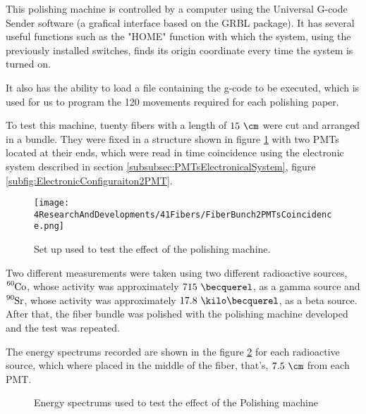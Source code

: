 This polishing machine is controlled by a computer using the Universal G-code Sender software (a grafical interface based on the GRBL package). It has several useful functions such as the "HOME" function with which the system, using the previously installed switches, finds its origin coordinate every time the system is turned on. 

It also has the ability to load a file containing the g-code to be executed, which is used for us to program the 120 movements required for each polishing paper.

To test this machine, tuenty fibers with a length of $15~\cm$ were cut and arranged in a bundle. They were fixed in a structure shown in figure \ref{fig:BunchWith2PMTsCoincidence} with two PMTs located at their ends, which were read in time coincidence using the electronic system described in section \ref{subsubsec:PMTsElectronicalSystem}, figure \ref{subfig:ElectronicConfiguraiton2PMT}.

\begin{figure}[]
\centering
\texttt{[image: 4ResearchAndDevelopments/41Fibers/FiberBunch2PMTsCoincidence.png]}
\caption{Set up used to test the effect of the polishing machine.\label{fig:BunchWith2PMTsCoincidence}}
\end{figure}

Two different measurements were taken using two different radioactive sources, $\ce{^{60}Co}$, whose activity was approximately $715~\becquerel$, as a gamma source and $\ce{^{90}Sr}$, whose activity was approximately $17.8~\kilo\becquerel$, as a beta source. After that, the fiber bundle was polished with the polishing machine developed and the test was repeated.

The energy spectrums recorded are shown in the figure \ref{fig:ResultsOfPolishingMachine} for each radioactive source, which where placed in the middle of the fiber, that's, $7.5~\cm$ from each PMT.

\begin{figure}[h]
 \centering
    \newline
 \caption{Energy spectrums used to test the effect of the Polishing machine}
 \label{fig:ResultsOfPolishingMachine}
\end{figure}

